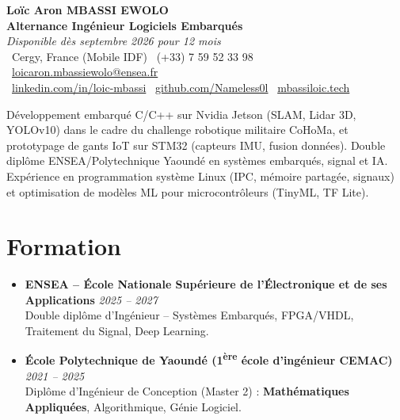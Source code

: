 \documentclass[a4paper,11pt]{article}
\begin{document}
\begin{center}
    {\Large \textbf{Loïc Aron MBASSI EWOLO}} \\ \vspace{4pt}
    \textbf{\large Alternance Ingénieur Logiciels Embarqués} \\
    \textit{\small Disponible dès septembre 2026 pour 12 mois} \\ \vspace{4pt}
    \small
    \faMapMarker\ Cergy, France (Mobile IDF) \quad
    \faPhone\ (+33) 7 59 52 33 98 \quad
    {\color{primary}\faEnvelope\ \href{mailto:loicaron.mbassiewolo@ensea.fr}{loicaron.mbassiewolo@ensea.fr}} \\ \vspace{2pt}
    {\color{primary}\faLinkedin\ \href{https://www.linkedin.com/in/loic-mbassi/}{linkedin.com/in/loic-mbassi}} \quad
    {\color{primary}\faGithub\ \href{https://github.com/Nameless0l}{github.com/Nameless0l}} \quad
    {\color{primary}\faGlobe\ \href{https://mbassiloic.tech}{mbassiloic.tech}}
\end{center}

\vspace{-6pt}

\noindent\small{Développement embarqué C/C++ sur Nvidia Jetson (SLAM, Lidar 3D, YOLOv10) dans le cadre du challenge robotique militaire CoHoMa, et prototypage de gants IoT sur STM32 (capteurs IMU, fusion données). Double diplôme ENSEA/Polytechnique Yaoundé en systèmes embarqués, signal et IA. Expérience en programmation système Linux (IPC, mémoire partagée, signaux) et optimisation de modèles ML pour microcontrôleurs (TinyML, TF Lite).}

\section{Formation}
\begin{itemize}[leftmargin=*, label=\tiny$\bullet$, nosep]
    \item \textbf{ENSEA -- École Nationale Supérieure de l'Électronique et de ses Applications} \hfill \textit{2025 -- 2027} \\
    \small{Double diplôme d'Ingénieur -- Systèmes Embarqués, FPGA/VHDL, Traitement du Signal, Deep Learning.}
    \item \textbf{École Polytechnique de Yaoundé (1\textsuperscript{ère} école d'ingénieur CEMAC)} \hfill \textit{2021 -- 2025} \\
    \small{Diplôme d'Ingénieur de Conception (Master 2) : \textbf{Mathématiques Appliquées}, Algorithmique, Génie Logiciel.}
\end{itemize}
\end{document}
